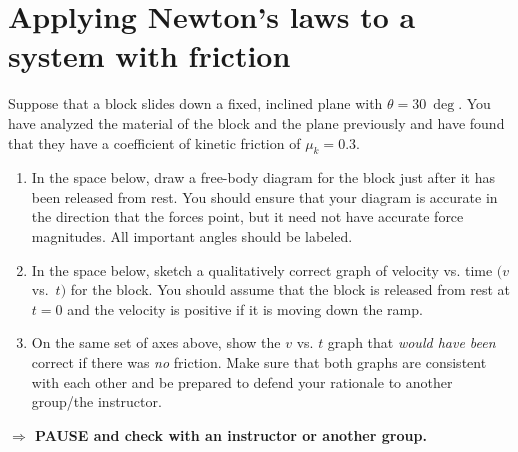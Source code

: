 \documentclass[12pt,hidelinks]{article}
\newcommand{\checkin}{{\bf \noindent $\Rightarrow$ PAUSE and check with an instructor or another
  group.}}
\begin{document}
\section{Applying Newton's laws to a system with friction}
Suppose that a block slides down a fixed, inclined plane with $\theta=\SI{30}{\deg}$.  You have
analyzed the material of the block and the plane previously and have found that they have a
coefficient of kinetic friction of $\mu_k = 0.3$.
\begin{enumerate}
  \item In the space below, draw a free-body diagram for the block just after it has been
  released from rest. You should ensure that your diagram is accurate in the direction that the
  forces point, but it need not have accurate force magnitudes.  All important angles should be
  labeled. \vspace{1.5in}
  \item In the space below, sketch a qualitatively correct graph of velocity vs. time $(v$ vs.\
  $t)$ for the block.  You should assume that the block is released from rest at $t=0$ and the
  velocity is positive if it is moving down the ramp.
  \begin{center}
  \end{center}
  \item On the same set of axes above, show the $v$ vs. $t$ graph that \textit{would have been}
  correct if there was \textit{no} friction.  Make sure that both graphs are consistent with
  each other and be prepared to defend your rationale to another group/the instructor. \vfill
\end{enumerate}

\checkin
\newpage
\end{document}
